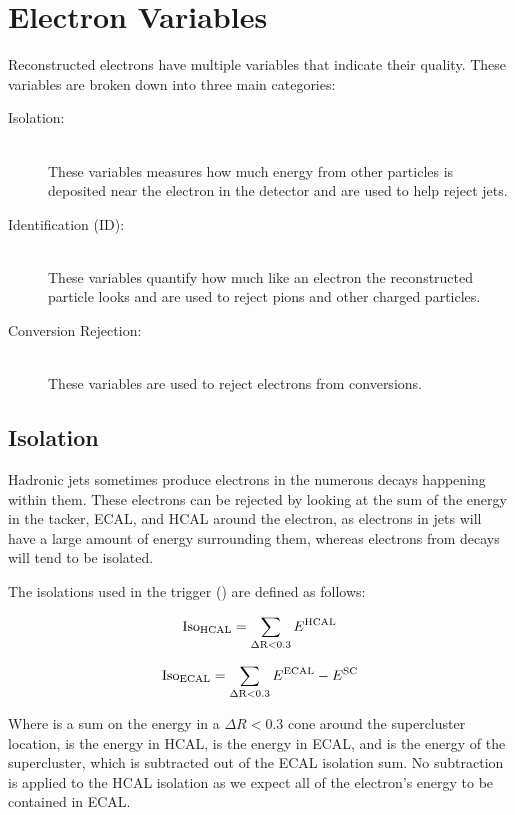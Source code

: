 \section{Electron Variables}
\label{sec:electron_variables}

Reconstructed electrons have multiple variables that indicate their quality.
These variables are broken down into three main categories:

\begin{description}
    \item[Isolation:] \hfill \\
        These variables measures how much energy from other particles is
        deposited near the electron in the detector and are used to help reject
        jets.
    \item[Identification (ID):] \hfill \\
        These variables quantify how much like an electron the reconstructed
        particle looks and are used to reject pions and other charged
        particles.
    \item[Conversion Rejection:] \hfill \\
        These variables are used to reject electrons from \photontoee
        conversions.
\end{description}

\subsection{Isolation}

Hadronic jets sometimes produce electrons in the numerous decays happening
within them. These electrons can be rejected by looking at the sum of the
energy in the tacker, ECAL, and HCAL around the electron, as electrons in jets
will have a large amount of energy surrounding them, whereas electrons from \Z
decays will tend to be isolated.

The isolations used in the trigger (\SingleElectronTrigger) are defined as
follows:

\begin{equation}
    \text{Iso}_{\text{HCAL}} = \sum_{\Delta \text{R}<0.3} E^{\text{HCAL}}
\end{equation}

\begin{equation}
    \text{Iso}_{\text{ECAL}} = \sum_{\Delta \text{R}<0.3} E^{\text{ECAL}} - E^{\text{SC}}
\end{equation}

Where \DeltaRSum is a sum on the energy in a $\Delta R < 0.3$ cone around the
supercluster location, \EHCAL is the energy in HCAL, \EECAL is the energy in
ECAL, and \ESC is the energy of the supercluster, which is subtracted out of
the ECAL isolation sum. No subtraction is applied to the HCAL isolation as we
expect all of the electron's energy to be contained in ECAL.

